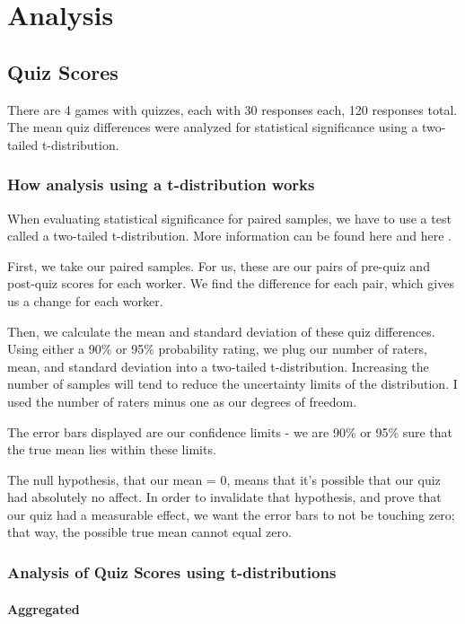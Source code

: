\chapter{Analysis}

	\section{Quiz Scores}
		There are 4 games with quizzes, each with 30 responses each, 120 responses total. The mean quiz differences were analyzed for statistical significance using a two-tailed t-distribution.

		\subsection{How analysis using a t-distribution works}

			When evaluating statistical significance for paired samples, we have to use a test called a two-tailed t-distribution. More information can be found here \cite{tdist1} and here \cite{tdist2}.

			First, we take our paired samples. For us, these are our pairs of pre-quiz and post-quiz scores for each worker. We find the difference for each pair, which gives us a change for each worker.

			Then, we calculate the mean and standard deviation of these quiz differences. Using either a 90\% or 95\% probability rating, we plug our number of raters, mean, and standard deviation into a two-tailed t-distribution. Increasing the number of samples will tend to reduce the uncertainty limits of the distribution. I used the number of raters minus one as our degrees of freedom.

			The error bars displayed are our confidence limits - we are 90\% or 95\% sure that the true mean lies within these limits. 

			The null hypothesis, that our mean = 0, means that it's possible that our quiz had absolutely no affect. In order to invalidate that hypothesis, and prove that our quiz had a measurable effect, we want the error bars to not be touching zero; that way, the possible true mean cannot equal zero.

		\subsection{Analysis of Quiz Scores using t-distributions}

			\subsubsection{Aggregated}

